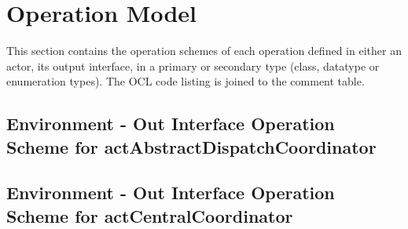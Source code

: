 \chapter{Operation Model}
\label{chap:lu.uni.lassy.excalibur.group09.spec-OM}

This section contains the operation schemes of each operation defined in either an actor, its output interface, in a primary or secondary type (class, datatype or enumeration types). 
The \msrmessir OCL code listing is joined to the comment table.

\lstset{
float,
basicstyle=\scriptsize,
language=Messir,
breakatwhitespace=false,
tabsize=2,
breaklines=true,
numbers=left,
emptylines=1,
numbersep=5pt,
showspaces=false,
showstringspaces=false,
showtabs=false
} 



		
\section{Environment - Out Interface Operation Scheme for actAbstractDispatchCoordinator}
\label{OM-EM-OutInterface-OS-actAbstractDispatchCoordinator}





\section{Environment - Out Interface Operation Scheme for actCentralCoordinator}
\label{OM-EM-OutInterface-OS-actCentralCoordinator}




